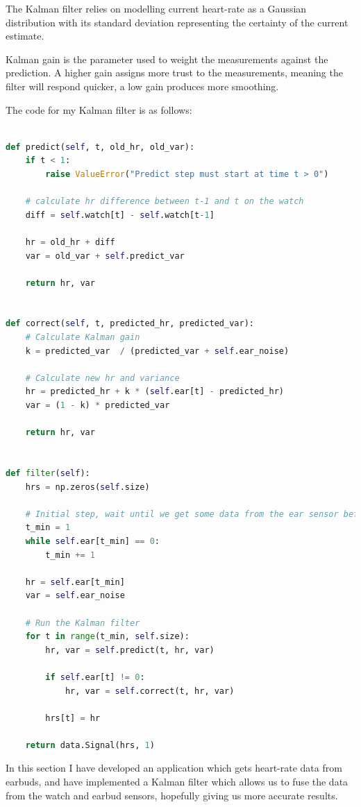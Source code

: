 \documentclass[12pt,a4paper,twoside,openright]{report}
\begin{document}
The Kalman filter relies on modelling current heart-rate as a Gaussian
distribution with its standard deviation representing the certainty of the
current estimate.

Kalman gain is the parameter used to weight the measurements against the
prediction. A higher gain assigns more trust to the measurements, meaning the
filter will respond quicker, a low gain produces more smoothing.

The code for my Kalman filter is as follows:


\begin{lstlisting}[language=Python]

def predict(self, t, old_hr, old_var):
    if t < 1:
        raise ValueError("Predict step must start at time t > 0")

    # calculate hr difference between t-1 and t on the watch
    diff = self.watch[t] - self.watch[t-1]

    hr = old_hr + diff
    var = old_var + self.predict_var

    return hr, var


def correct(self, t, predicted_hr, predicted_var):
    # Calculate Kalman gain
    k = predicted_var  / (predicted_var + self.ear_noise)

    # Calculate new hr and variance
    hr = predicted_hr + k * (self.ear[t] - predicted_hr)
    var = (1 - k) * predicted_var

    return hr, var


def filter(self):
    hrs = np.zeros(self.size)

    # Initial step, wait until we get some data from the ear sensor before starting the filter
    t_min = 1
    while self.ear[t_min] == 0:
        t_min += 1

    hr = self.ear[t_min]
    var = self.ear_noise

    # Run the Kalman filter
    for t in range(t_min, self.size):
        hr, var = self.predict(t, hr, var)

        if self.ear[t] != 0:
            hr, var = self.correct(t, hr, var)

        hrs[t] = hr

    return data.Signal(hrs, 1)

\end{lstlisting}

In this section I have developed an application which gets heart-rate data from
earbuds, and have implemented a Kalman filter which allows us to fuse the data
from the watch and earbud sensors, hopefully giving us more accurate results.
\end{document}
